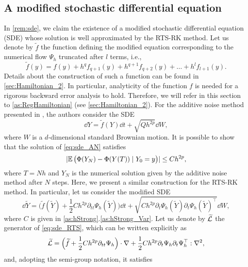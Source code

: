 \documentclass[10pt]{article}
\begin{document}
\subsection*{A modified stochastic differential equation}
In \cref{rem:sde}, we claim the existence of a modified stochastic differential equation (SDE) whose solution is well approximated by the RTS-RK method. Let us denote by $\tilde f$ the function defining the modified equation corresponding to the numerical flow $\Psi_h$ truncated after $l$ terms, i.e., 
\begin{equation}
	\tilde f(y) = f(y) + h^q f_{q+1}(y) + h^{q+1} f_{q+2}(y) + \ldots + h^l f_{l+1}(y).
\end{equation}
Details about the construction of such a function can be found in \cref{sec:Hamiltonian_2}. In particular, analyticity of the function $f$ is needed for a rigorous backward error analysis to hold. Therefore, we will refer in this section to \cref{as:RegHamiltonian} (see \cref{sec:Hamiltonian_2}). For the additive noise method presented in \cite{CGS17}, the authors consider the SDE 
\begin{equation}\label{eq:sde_AN}
	\dd Y = \tilde f(Y) \dd t + \sqrt{Q h^{2p}} \dd W,
\end{equation}
where $W$ is a $d$-dimensional standard Brownian motion. It is possible to show \cite[Theorem 2.4]{CGS17} that the solution of \eqref{eq:sde_AN} satisfies
\begin{equation}
	\lvert\operatorname{\mathbb{E}}\big(\Phi(Y_N) - \Phi(Y(T)) \mid Y_0 = y \big)\rvert \leq Ch^{2p},		
\end{equation}
where $T = Nh$ and $Y_N$ is the numerical solution given by the additive noise method after $N$ steps. Here, we present a similar construction for the RTS-RK method. In particular, let us consider the modified SDE
\begin{equation}\label{eq:sde_RTS}
	\dd\tilde Y = \Big(\tilde f(\tilde Y) + \frac{1}{2}Ch^{2p}\partial_{tt}\Psi_h(\tilde Y)\Big) \dd t + \sqrt{Ch^{2p}\partial_t \Psi_h(\tilde Y)\partial_t \Psi_h(\tilde Y)^\top} \dd W,
\end{equation}
where $C$ is given in \cref{as:hStrong}.\ref{as:hStrong_Var}. Let us denote by $\widetilde {\mathcal{L}}$ the generator of \eqref{eq:sde_RTS}, which can be written explicitly as
\begin{equation}
	\widetilde {\mathcal{L}} = \Big(\widetilde f + \frac{1}{2}Ch^{2p}\partial_{tt}\Psi_h\Big) \cdot \nabla + \frac{1}{2}Ch^{2p}\partial_t \Psi_h \partial_t \Psi_h^\top : \nabla^2,
\end{equation}
and, adopting the semi-group notation, it satisfies
\end{document}
